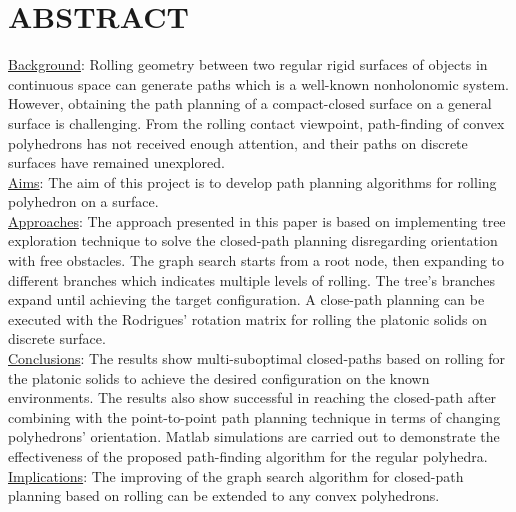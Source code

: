 
\noindent\section{ABSTRACT}
\noindent \uline{Background}: 
Rolling geometry between two regular rigid surfaces of objects in continuous space can generate paths which is a well-known nonholonomic system. However, obtaining the path planning of a compact-closed surface on a general surface is challenging. From the rolling contact viewpoint, path-finding of convex polyhedrons has not received enough attention, and their paths on discrete surfaces have remained unexplored. \\
\noindent \uline{Aims}: The aim of this project is to develop path planning algorithms for rolling polyhedron on a surface.\\
%
\noindent \uline{Approaches}: 
The approach presented in this paper is based on implementing tree exploration technique to solve the closed-path planning disregarding orientation with free obstacles. 
The graph search starts from a root node, then expanding to different branches which indicates multiple levels of rolling. 
The tree's branches expand until achieving the target configuration. 
A close-path planning can be executed with the Rodrigues' rotation matrix for rolling the platonic solids on discrete surface.\\
%
\noindent \uline{Conclusions}: 
The results show multi-suboptimal closed-paths based on rolling for the platonic solids to achieve the desired configuration on the known environments. 
The results also show successful in reaching the closed-path after combining with the point-to-point path planning technique in terms of changing polyhedrons' orientation.
Matlab simulations are carried out to demonstrate the effectiveness of the proposed path-finding algorithm for the regular polyhedra. \\ 
%
\noindent \uline{Implications}: 
The improving of the graph search algorithm for closed-path planning based on rolling can be extended to any convex polyhedrons.




